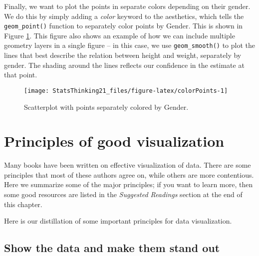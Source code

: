 \documentclass[]{book}
\newenvironment{Shaded}{\begin{snugshade}}{\end{snugshade}}
\newcommand{\KeywordTok}[1]{\textcolor[rgb]{0.13,0.29,0.53}{\textbf{#1}}}
\newcommand{\DataTypeTok}[1]{\textcolor[rgb]{0.13,0.29,0.53}{#1}}
\newcommand{\StringTok}[1]{\textcolor[rgb]{0.31,0.60,0.02}{#1}}
\newcommand{\OperatorTok}[1]{\textcolor[rgb]{0.81,0.36,0.00}{\textbf{#1}}}
\newcommand{\NormalTok}[1]{#1}
\theoremstyle{definition}
\theoremstyle{definition}
\theoremstyle{definition}
\theoremstyle{remark}
\begin{document}
Finally, we want to plot the points in separate colors depending on
their gender. We do this by simply adding a \emph{color} keyword to the
aesthetics, which tells the \texttt{geom\_point()} function to
separately color points by Gender. This is shown in Figure
\ref{fig:colorPoints}. This figure also shows an example of how we can
include multiple geometry layers in a single figure -- in this case, we
use \texttt{geom\_smooth()} to plot the lines that best describe the
relation between height and weight, separately by gender. The shading
around the lines reflects our confidence in the estimate at that point.

\begin{Shaded}
\end{Shaded}

\begin{figure}
\texttt{[image: StatsThinking21\_files/figure-latex/colorPoints-1]} \caption{Scatterplot with points separately colored by Gender.}\label{fig:colorPoints}
\end{figure}

\section{Principles of good
visualization}\label{principles-of-good-visualization}

Many books have been written on effective visualization of data. There
are some principles that most of these authors agree on, while others
are more contentious. Here we summarize some of the major principles; if
you want to learn more, then some good resources are listed in the
\emph{Suggested Readings} section at the end of this chapter.

Here is our distillation of some important principles for data
visualization.

\subsection{Show the data and make them stand
out}\label{show-the-data-and-make-them-stand-out}
\end{document}
